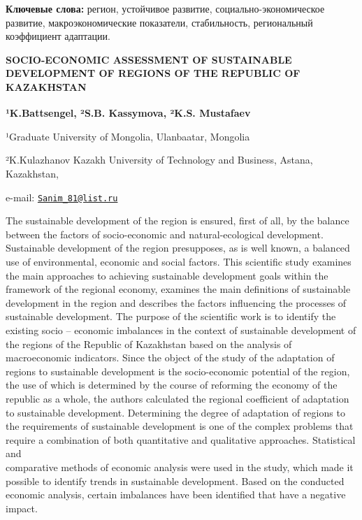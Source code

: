 {\bfseries Ключевые слова:} регион, устойчивое развитие,
социально-экономическое развитие, макроэкономические показатели,
стабильность, региональный коэффициент адаптации.

\begin{articleheader}
{\bfseries SOCIO-ECONOMIC ASSESSMENT OF SUSTAINABLE DEVELOPMENT OF REGIONS
OF THE REPUBLIC OF KAZAKHSTAN}

{\bfseries ¹K.Battsengel\textsuperscript{\envelope }, ²S.B. Kassymova, ²K.S.
Mustafaev}
\end{articleheader}

\begin{affiliation}
¹Graduate University of Mongolia, Ulanbaatar, Mongolia

²K.Kulazhanov Kazakh University of Technology and Business, Astana,
Kazakhstan,

e-mail: \href{mailto:Sanim_81@list.ru}{\nolinkurl{Sanim\_81@list.ru}}
\end{affiliation}

The sustainable development of the region is ensured, first of all, by
the balance between the factors of socio-economic and natural-ecological
development. Sustainable development of the region presupposes, as is
well known, a balanced use of environmental, economic and social
factors. This scientific study examines the main approaches to achieving
sustainable development goals within the framework of the regional
economy, examines the main definitions of sustainable development in the
region and describes the factors influencing the processes of
sustainable development. The purpose of the scientific work is to
identify the existing socio -- economic imbalances in the context of
sustainable development of the regions of the Republic of Kazakhstan
based on the analysis of macroeconomic indicators. Since the object of
the study of the adaptation of regions to sustainable development is the
socio-economic potential of the region, the use of which is determined
by the course of reforming the economy of the republic as a whole, the
authors calculated the regional coefficient of adaptation to sustainable
development. Determining the degree of adaptation of regions to the
requirements of sustainable development is one of the complex problems
that require a combination of both quantitative and qualitative
approaches. Statistical and \\comparative methods of economic analysis
were used in the study, which made it possible to identify trends in
sustainable development. Based on the conducted economic analysis,
certain imbalances have been identified that have a negative impact.

